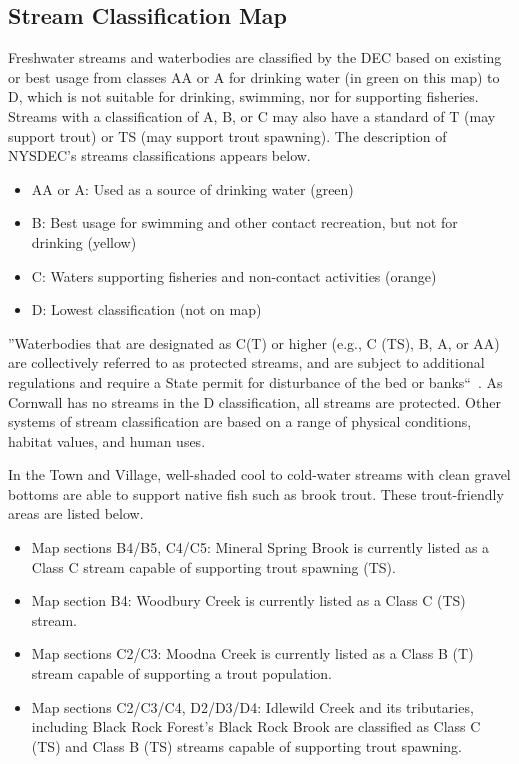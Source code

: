 \subsection*{Stream Classification Map}
Freshwater streams and waterbodies are classified by the DEC based on existing 
or best usage from classes AA or A for drinking water (in green on this map) to 
D, which is not suitable for drinking, swimming, nor for supporting fisheries. 
Streams with a classification of A, B, or C may also have a standard of T (may 
support trout) or TS (may support trout spawning). The description of NYSDEC’s 
streams classifications appears below.
\begin{itemize}
    \item AA or A: Used as a source of drinking water (green)
    \item B: Best usage for swimming and other contact recreation, but not for
        drinking (yellow)
    \item C: Waters supporting fisheries and non-contact activities (orange)
    \item D: Lowest classification (not on map)
\end{itemize}
''Waterbodies that are designated as C(T) or higher (e.g., C (TS), B, A, or AA) 
are collectively referred to as protected streams, and are subject to 
additional regulations and require a State permit for disturbance of the bed or 
banks``~\citep{haeckel2014}. As Cornwall has no streams in the D 
classification, all streams are protected. Other systems of stream 
classification are based on a range of physical conditions, habitat values, and 
human uses.

In the Town and Village, well-shaded cool to cold-water streams with clean 
gravel bottoms are able to support native fish such as brook trout. These 
trout-friendly areas are listed below.
\begin{itemize}
    \item Map sections B4/B5, C4/C5: Mineral Spring Brook is currently listed 
as a Class C stream capable of supporting trout spawning (TS).
    \item Map section B4: Woodbury Creek is currently listed as a Class C (TS) 
stream.
    \item Map sections C2/C3: Moodna Creek is currently listed as a Class B (T) 
stream capable of supporting a trout population.
    \item Map sections C2/C3/C4, D2/D3/D4: Idlewild Creek and its tributaries, 
including Black Rock Forest’s Black Rock Brook are classified as Class C (TS) 
and Class B (TS) streams capable of supporting trout spawning.
\end{itemize}

